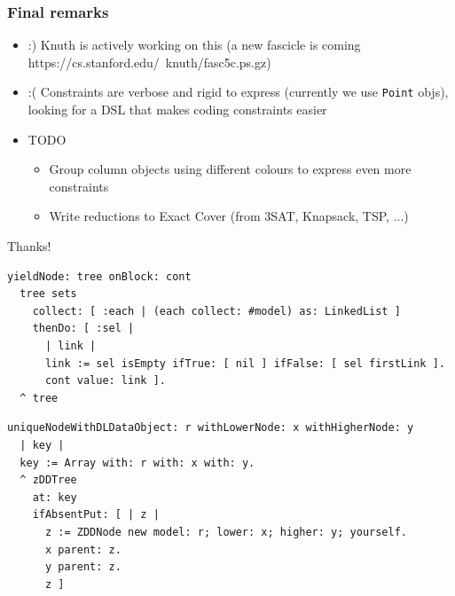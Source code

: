 \documentclass[10pt]{beamer}
\begin{document}
\begin{frame}[fragile]
\frametitle{Final remarks}
\begin{itemize}
  \item :) Knuth is actively working on this (a new fascicle is coming https://cs.stanford.edu/~knuth/fasc5c.ps.gz)
  \item :( Constraints are verbose and rigid to express (currently we use \texttt{Point} objs), 
        looking for a DSL that makes coding constraints easier
  \item TODO
    \begin{itemize}
      \item Group column objects using different colours to express even more constraints
      \item Write reductions to Exact Cover (from $3$SAT, Knapsack, TSP, ...)
    \end{itemize}
\end{itemize}
\end{frame}

\begin{frame}{ }
\Huge Thanks!
\end{frame}

\begin{frame}[fragile]
\begin{verbatim}
yieldNode: tree onBlock: cont
  tree sets
    collect: [ :each | (each collect: #model) as: LinkedList ]
    thenDo: [ :sel | 
      | link |
      link := sel isEmpty ifTrue: [ nil ] ifFalse: [ sel firstLink ].
      cont value: link ].
  ^ tree
\end{verbatim}
\vfill
\begin{verbatim}
uniqueNodeWithDLDataObject: r withLowerNode: x withHigherNode: y
  | key |
  key := Array with: r with: x with: y.
  ^ zDDTree
    at: key
    ifAbsentPut: [ | z |
      z := ZDDNode new model: r; lower: x; higher: y; yourself.
      x parent: z.
      y parent: z.
      z ]
\end{verbatim}
\end{frame}
\end{document}
